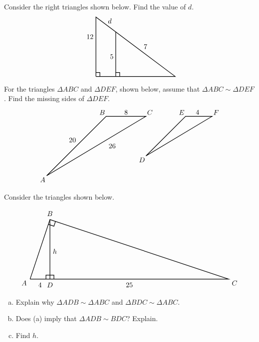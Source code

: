 \documentclass[11pt,letterpaper]{article}
\begin{document}

 Consider the right triangles shown below. Find the value of $d$.
	\[
	\begin{tikzpicture}
	\draw[line width=0.03cm] (0,0) -- (0,3) -- (4,0) -- (0,0);
	\draw[line width=0.03cm] (1,0) -- (1,2.25);
	\draw[line width=0.03cm] (0,0.2) -- (0.2,0.2) -- (0.2,0);
	\draw[line width=0.03cm] (1,0.2) -- (1.2,0.2) -- (1.2,0);
	\node at (-0.3,2) {$12$};
	\node at (0.8,1) {$5$};
	\node at (0.7,2.8) {$d$};
	\node at (2.5,1.5) {$7$};
	\end{tikzpicture}
	\]



\newpage



 For the triangles $\Delta ABC$ and $\Delta DEF$, shown below, assume that $\Delta ABC \sim \Delta DEF$. Find the missing sides of $\Delta DEF$. 
	\[
	\begin{tikzpicture}
	\node at (-3.2,-3.2) {$A$};
	\node at (-0.2,0.2) {$B$};
	\node at (2.2,0.2) {$C$};
	\node at (-1.7,-1.2) {$20$};
	\node at (1,0.2) {$8$};
	\node at (0.3,-1.5) {$26$};
	\draw[line width=0.03cm] (-3,-3) -- (0,0) -- (2,0) -- (-3,-3);
	
	\tikzset{shift={(4,0)}}
	
	\node at (-2.2,-2.2) {$D$};
	\node at (-0.2,0.2) {$E$};
	\node at (4/3+0.2,0.2) {$F$};
	\node at (0.6,0.2) {$4$};
	\draw[line width=0.03cm] (-2,-2) -- (0,0) -- (4/3,0) -- (-2,-2);
	\end{tikzpicture}
	\]



\newpage



 Consider the triangles shown below. \par
	\[
	\begin{tikzpicture}
	\draw[line width=0.03cm] (0,0) -- (1,3) -- (10,0) -- (0,0);
	\draw[line width=0.03cm] (1,3) -- (1,0);
	\draw[line width=0.03cm] (0.8,0) -- (0.8,0.2) -- (1.2,0.2) -- (1.2,0);
	\draw[line width=0.03cm] (0.92,2.76) -- (1.2,2.666) -- (1.2802,2.9066);
	\node at (-0.3,-0.2) {$A$};
	\node at (1,3.3) {$B$};
	\node at (10.3,-0.2) {$C$};
	\node at (1,-0.3) {$D$};
	\node at (0.5,-0.3) {$4$};
	\node at (1.25,1.4) {$h$};
	\node at (5,-0.3) {$25$};
	\end{tikzpicture}
	\] \par

\begin{enumerate}[(a)]
\item Explain why $\Delta ADB \sim \Delta ABC$ and $\Delta BDC \sim \Delta ABC$. 
\item Does (a) imply that $\Delta ADB \sim BDC$? Explain. 
\item Find $h$. 
\end{enumerate}
\end{document}
